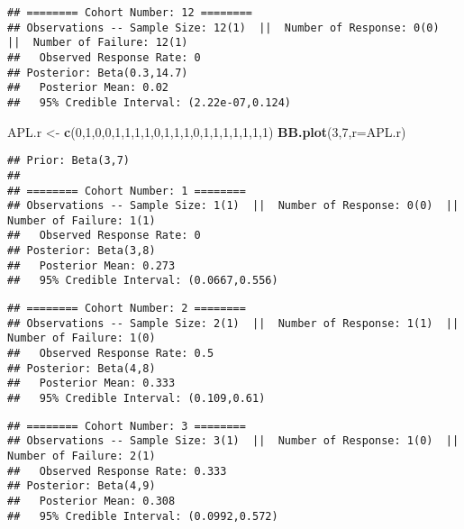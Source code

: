 \documentclass[]{article}
\newenvironment{Shaded}{\begin{snugshade}}{\end{snugshade}}
\newcommand{\KeywordTok}[1]{\textcolor[rgb]{0.13,0.29,0.53}{\textbf{{#1}}}}
\newcommand{\DataTypeTok}[1]{\textcolor[rgb]{0.13,0.29,0.53}{{#1}}}
\newcommand{\DecValTok}[1]{\textcolor[rgb]{0.00,0.00,0.81}{{#1}}}
\newcommand{\StringTok}[1]{\textcolor[rgb]{0.31,0.60,0.02}{{#1}}}
\newcommand{\NormalTok}[1]{{#1}}
\begin{document}
\begin{verbatim}
## ======== Cohort Number: 12 ======== 
## Observations -- Sample Size: 12(1)  ||  Number of Response: 0(0)  ||  Number of Failure: 12(1)
##   Observed Response Rate: 0
## Posterior: Beta(0.3,14.7) 
##   Posterior Mean: 0.02
##   95% Credible Interval: (2.22e-07,0.124)
\end{verbatim}


\begin{Shaded}
\begin{Highlighting}[]
\NormalTok{APL.r <-}\StringTok{ }\KeywordTok{c}\NormalTok{(}\DecValTok{0}\NormalTok{,}\DecValTok{1}\NormalTok{,}\DecValTok{0}\NormalTok{,}\DecValTok{0}\NormalTok{,}\DecValTok{1}\NormalTok{,}\DecValTok{1}\NormalTok{,}\DecValTok{1}\NormalTok{,}\DecValTok{1}\NormalTok{,}\DecValTok{0}\NormalTok{,}\DecValTok{1}\NormalTok{,}\DecValTok{1}\NormalTok{,}\DecValTok{1}\NormalTok{,}\DecValTok{0}\NormalTok{,}\DecValTok{1}\NormalTok{,}\DecValTok{1}\NormalTok{,}\DecValTok{1}\NormalTok{,}\DecValTok{1}\NormalTok{,}\DecValTok{1}\NormalTok{,}\DecValTok{1}\NormalTok{,}\DecValTok{1}\NormalTok{)}
\KeywordTok{BB.plot}\NormalTok{(}\DecValTok{3}\NormalTok{,}\DecValTok{7}\NormalTok{,}\DataTypeTok{r=}\NormalTok{APL.r)}
\end{Highlighting}
\end{Shaded}

\begin{verbatim}
## Prior: Beta(3,7) 
## 
## ======== Cohort Number: 1 ======== 
## Observations -- Sample Size: 1(1)  ||  Number of Response: 0(0)  ||  Number of Failure: 1(1)
##   Observed Response Rate: 0
## Posterior: Beta(3,8) 
##   Posterior Mean: 0.273
##   95% Credible Interval: (0.0667,0.556)
\end{verbatim}

\begin{verbatim}
## ======== Cohort Number: 2 ======== 
## Observations -- Sample Size: 2(1)  ||  Number of Response: 1(1)  ||  Number of Failure: 1(0)
##   Observed Response Rate: 0.5
## Posterior: Beta(4,8) 
##   Posterior Mean: 0.333
##   95% Credible Interval: (0.109,0.61)
\end{verbatim}

\begin{verbatim}
## ======== Cohort Number: 3 ======== 
## Observations -- Sample Size: 3(1)  ||  Number of Response: 1(0)  ||  Number of Failure: 2(1)
##   Observed Response Rate: 0.333
## Posterior: Beta(4,9) 
##   Posterior Mean: 0.308
##   95% Credible Interval: (0.0992,0.572)
\end{verbatim}
\end{document}
